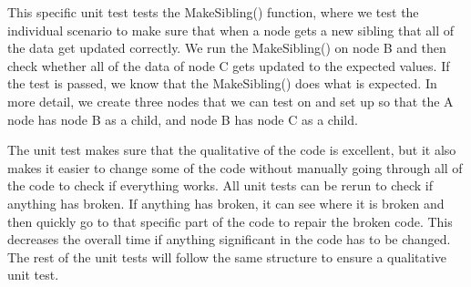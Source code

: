 This specific unit test tests the MakeSibling() function, where we test the individual scenario to make sure that when a node gets a new sibling that all of the data get updated correctly. We run the MakeSibling() on node B and then check whether all of the data of node C gets updated to the expected values. If the test is passed, we know that the MakeSibling() does what is expected. In more detail, we create three nodes that we can test on and set up so that the A node has node B as a child, and node B has node C as a child.

The unit test makes sure that the qualitative of the code is excellent, but it also makes it easier to change some of the code without manually going through all of the code to check if everything works. All unit tests can be rerun to check if anything has broken. If anything has broken, it can see where it is broken and then quickly go to that specific part of the code to repair the broken code. This decreases the overall time if anything significant in the code has to be changed. The rest of the unit tests will follow the same structure to ensure a qualitative unit test.